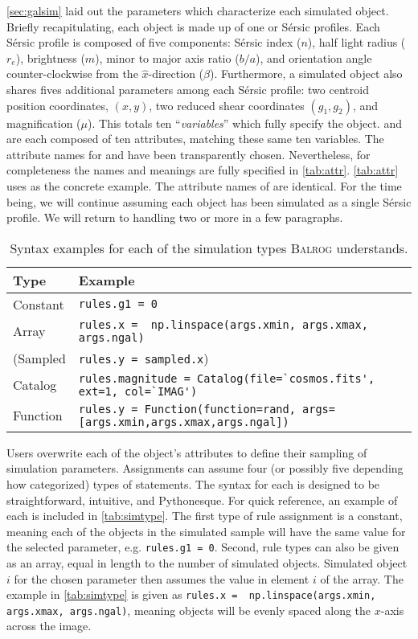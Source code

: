 \documentclass[11pt]{book}
\newcommand{\codett}[1]{\lstinline{#1}}
\newcommand{\py}{Python}
\newcommand{\balrog}{\textsc{Balrog}}
\newcommand{\sersic}{S\'{e}rsic}
\begin{document}
\autoref{sec:galsim} laid out the parameters which characterize each simulated object.
Briefly recapitulating, each object is made up of one or \sersic{} profiles.
Each \sersic{} profile is composed of five components: 
\sersic{} index ($n$), half light radius ($r_e$), brightness ($m$), minor to major axis ratio ($b/a$), 
and orientation angle counter-clockwise from the $\hat{x}$-direction ($\beta$).
Furthermore, a simulated object also shares fives additional parameters among each \sersic{} profile:
two centroid position coordinates, $(x,y)$, two reduced shear coordinates $(g_1,g_2)$, and magnification ($\mu$).
This totals ten ``\emph{variables}'' which fully specify the object.
\simrules{} and \simsamp{} are each composed of ten attributes,
matching these same ten variables.
The attribute names for \simrules{} and \simsamp{} have been transparently chosen.
Nevertheless, for completeness the names and meanings are fully specified in \autoref{tab:attr}.
\autoref{tab:attr} uses \simrules{} as the concrete example.
The attribute names of \simsamp{} are identical. 
For the time being, we will continue assuming each object has been simulated as a single \sersic{} profile.
We will return to handling two or more in a few paragraphs.

\begin{table} 
\caption{Syntax examples for each of the simulation types \balrog{} understands.} \label{tab:simtype}
\begin{tabular} {l l}
\toprule %
\textbf{Type} & \textbf{Example} \\ \midrule
Constant & \codett{rules.g1 = 0} \\
Array & \codett{rules.x =  np.linspace(args.xmin, args.xmax, args.ngal)} \\
(Sampled  & \codett{rules.y = sampled.x}) \\
Catalog & \codett{rules.magnitude = Catalog(file=`cosmos.fits', ext=1, col=`IMAG')} \\
Function & \codett{rules.y = Function(function=rand, args=[args.xmin,args.xmax,args.ngal])} \\ \bottomrule %
\end{tabular}
\end{table}

Users overwrite each of the \simrules{} object's attributes to define their sampling of simulation parameters.
Assignments can assume four (or possibly five depending how categorized) types of statements. 
The syntax for each is designed to be straightforward, intuitive, and \py{}esque.
For quick reference, an example of each is included in \autoref{tab:simtype}.
The first type of rule assignment is a constant, meaning each of the objects in the simulated sample
will have the same value for the selected parameter, e.g. \codett{rules.g1 = 0}.
Second, rule types can also be given as an array, equal in length to the number of simulated objects. 
Simulated object $i$ for the chosen parameter then assumes the value in element $i$ of the array.
The example in \autoref{tab:simtype} is given as \codett{rules.x =  np.linspace(args.xmin, args.xmax, args.ngal)},
meaning objects will be evenly spaced along the $x$-axis across the image.
\end{document}
